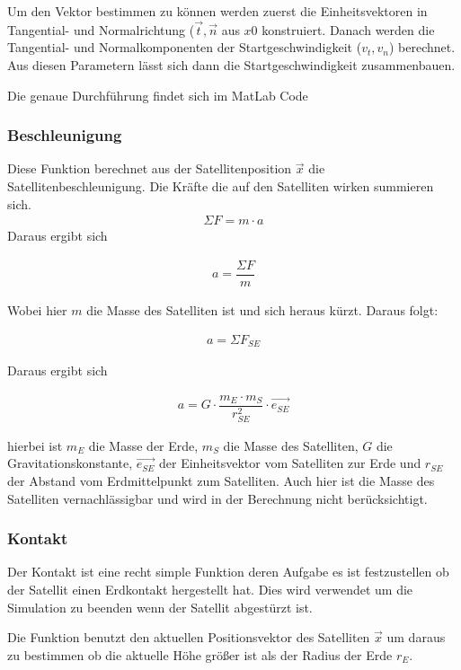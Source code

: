 \documentclass[]{scrartcl}
\begin{document}
Um den Vektor bestimmen zu können werden zuerst die Einheitsvektoren in Tangential- und Normalrichtung ($\vec{t}, \vec{n}$ aus $x0$ konstruiert. Danach werden die Tangential- und Normalkomponenten der Startgeschwindigkeit ($v_t , v_n$) berechnet. Aus diesen Parametern lässt sich dann die Startgeschwindigkeit zusammenbauen.

Die genaue Durchführung findet sich im MatLab Code

\subsubsection{Beschleunigung}
Diese Funktion berechnet aus der Satellitenposition $\vec{x}$ die Satellitenbeschleunigung.
Die Kräfte die auf den Satelliten wirken summieren sich. 
\begin{align}
\Sigma{F} = m \cdot a
\end{align}
Daraus ergibt sich 

\begin{align}
a = \dfrac{\Sigma{F}}{m}
\end{align}

Wobei hier $m$ die Masse des Satelliten ist und sich heraus kürzt. Daraus folgt:

\begin{align}
a = \Sigma{F}_{SE}
\end{align}

Daraus ergibt sich

\begin{align}
a = G \cdot \dfrac{m_E \cdot m_S }{r^2_{SE}} \cdot \vec{e_{SE}}
\end{align}

hierbei ist $m_E$ die Masse der Erde, $m_S$ die Masse des Satelliten, $G$ die Gravitationskonstante, $\vec{e_{SE}}$  der Einheitsvektor vom Satelliten zur Erde und $r_{SE}$ der Abstand vom Erdmittelpunkt zum Satelliten. Auch hier ist die Masse des Satelliten vernachlässigbar und wird in der Berechnung nicht berücksichtigt.

\subsubsection{Kontakt}

Der Kontakt ist eine recht simple Funktion deren Aufgabe es ist festzustellen ob der Satellit einen Erdkontakt hergestellt hat. Dies wird verwendet um die Simulation zu beenden wenn der Satellit abgestürzt ist.

Die Funktion benutzt den aktuellen Positionsvektor des Satelliten $\vec{x}$ um daraus zu bestimmen ob die aktuelle Höhe größer ist als der Radius der Erde $r_E$.
\end{document}
